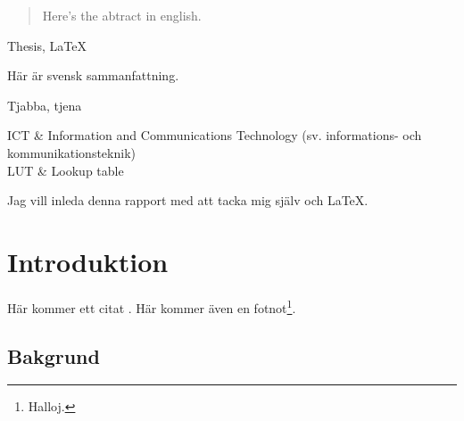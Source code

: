 \def \pdf {cover.pdf}					%
\def \authorname {Olle Calderon}		%




\postbegindocument


\begin{abstract}
Here's the abtract in english.
\end{abstract}

\begin{keywords}
Thesis, \LaTeX
\end{keywords}

\begin{sammanfattning}
Här är svensk sammanfattning.
\end{sammanfattning}

\begin{nyckelord}
Tjabba, tjena
\end{nyckelord}

\tableofcontents
\clearpage

\begin{definitioner}
ICT & Information and Communications Technology (sv. informations- och kommunikationsteknik)\\
LUT & Lookup table
\end{definitioner}

\begin{foerord}
Jag vill inleda denna rapport med att tacka mig själv och \LaTeX.
\end{foerord}

\section{Introduktion}
Här kommer ett citat \cite{exempelreferens}. Här kommer även en fotnot\footnote{Halloj.}.

\subsection{Bakgrund}

